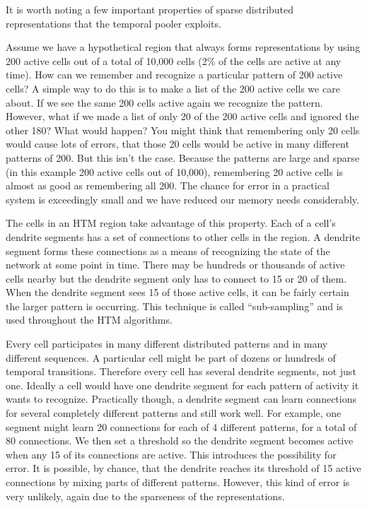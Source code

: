 \documentclass{report}
\begin{document}
It is worth noting a few important properties of sparse distributed
representations that the temporal pooler exploits.

Assume we have a hypothetical region that always forms representations
by using 200 active cells out of a total of 10,000 cells (2\% of the
cells are active at any time). How can we remember and recognize a
particular pattern of 200 active cells? A simple way to do this is to
make a list of the 200 active cells we care about. If we see the same
200 cells active again we recognize the pattern. However, what if we
made a list of only 20 of the 200 active cells and ignored the other
180? What would happen? You might think that remembering only 20 cells
would cause lots of errors, that those 20 cells would be active in
many different patterns of 200. But this isn't the case. Because the
patterns are large and sparse (in this example 200 active cells out of
10,000), remembering 20 active cells is almost as good as remembering
all 200. The chance for error in a practical system is exceedingly
small and we have reduced our memory needs considerably.

The cells in an HTM region take advantage of this property. Each of a
cell's dendrite segments has a set of connections to other cells in
the region. A dendrite segment forms these connections as a means of
recognizing the state of the network at some point in time. There may
be hundreds or thousands of active cells nearby but the dendrite
segment only has to connect to 15 or 20 of them. When the dendrite
segment sees 15 of those active cells, it can be fairly certain the
larger pattern is occurring. This technique is called ``sub-sampling''
and is used throughout the HTM algorithms.

Every cell participates in many different distributed patterns and in
many different sequences. A particular cell might be part of dozens or
hundreds of temporal transitions. Therefore every cell has several
dendrite segments, not just one. Ideally a cell would have one
dendrite segment for each pattern of activity it wants to
recognize. Practically though, a dendrite segment can learn
connections for several completely different patterns and still work
well. For example, one segment might learn 20 connections for each of
4 different patterns, for a total of 80 connections. We then set a
threshold so the dendrite segment becomes active when any 15 of its
connections are active. This introduces the possibility for error. It
is possible, by chance, that the dendrite reaches its threshold of 15
active connections by mixing parts of different patterns. However,
this kind of error is very unlikely, again due to the sparseness of
the representations.
\end{document}
